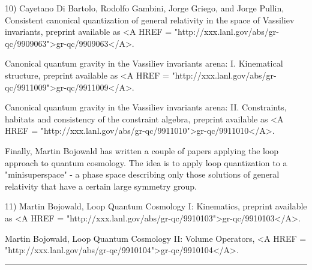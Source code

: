 10) Cayetano Di Bartolo, Rodolfo Gambini, Jorge Griego, and Jorge
Pullin, Consistent canonical quantization of general relativity in the
space of Vassiliev invariants, preprint available as <A HREF = "http://xxx.lanl.gov/abs/gr-qc/9909063">gr-qc/9909063</A>.

Canonical quantum gravity in the Vassiliev invariants arena:
I. Kinematical structure, preprint available as <A HREF = "http://xxx.lanl.gov/abs/gr-qc/9911009">gr-qc/9911009</A>.

Canonical quantum gravity in the Vassiliev invariants arena: II. 
Constraints, habitats and consistency of the constraint algebra,
preprint available as <A HREF = "http://xxx.lanl.gov/abs/gr-qc/9911010">gr-qc/9911010</A>.

Finally, Martin Bojowald has written a couple of papers applying the
loop approach to quantum cosmology.  The idea is to apply loop
quantization to a "minisuperspace" - a phase space describing only those
solutions of general relativity that have a certain large symmetry
group.

11) Martin Bojowald, Loop Quantum Cosmology I: Kinematics, preprint
available as <A HREF = "http://xxx.lanl.gov/abs/gr-qc/9910103">gr-qc/9910103</A>.

Martin Bojowald, Loop Quantum Cosmology II: Volume Operators, 
<A HREF = "http://xxx.lanl.gov/abs/gr-qc/9910104">gr-qc/9910104</A>.








 \par\noindent\rule{\textwidth}{0.4pt}

